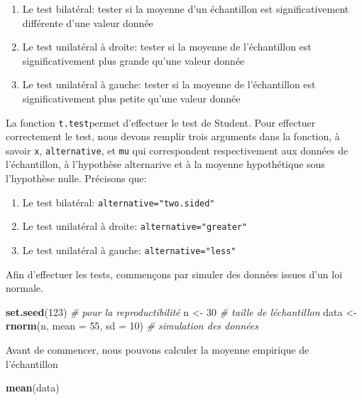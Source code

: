 \documentclass[
]{book}
\newenvironment{Shaded}{\begin{snugshade}}{\end{snugshade}}
\newcommand{\AttributeTok}[1]{\textcolor[rgb]{0.13,0.29,0.53}{#1}}
\newcommand{\CommentTok}[1]{\textcolor[rgb]{0.56,0.35,0.01}{\textit{#1}}}
\newcommand{\DecValTok}[1]{\textcolor[rgb]{0.00,0.00,0.81}{#1}}
\newcommand{\FunctionTok}[1]{\textcolor[rgb]{0.13,0.29,0.53}{\textbf{#1}}}
\newcommand{\NormalTok}[1]{#1}
\newcommand{\OtherTok}[1]{\textcolor[rgb]{0.56,0.35,0.01}{#1}}
\providecommand{\tightlist}{%
  \setlength{\itemsep}{0pt}\setlength{\parskip}{0pt}}
\begin{document}
\begin{enumerate}
\def\labelenumi{\arabic{enumi}.}
\tightlist
\item
  Le test bilatéral: tester si la moyenne d'un échantillon est significativement différente d'une valeur donnée
\item
  Le test unilatéral à droite: tester si la moyenne de l'échantillon est significativement plus grande qu'une valeur donnée
\item
  Le test unilatéral à gauche: tester si la moyenne de l'échantillon est significativement plus petite qu'une valeur donnée
\end{enumerate}

La fonction \texttt{t.test}permet d'effectuer le test de Student. Pour effectuer correctement le test, nous devons remplir trois arguments dans la fonction, à savoir \texttt{x}, \texttt{alternative}, et \texttt{mu} qui correspondent respectivement aux données de l'échantillon, à l'hypothèse alternarive et à la moyenne hypothétique sous l'hypothèse nulle. Précisons que:

\begin{enumerate}
\def\labelenumi{\arabic{enumi}.}
\tightlist
\item
  Le test bilatéral: \texttt{alternative="two.sided"}
\item
  Le test unilatéral à droite: \texttt{alternative="greater"}
\item
  Le test unilatéral à gauche: \texttt{alternative="less"}
\end{enumerate}

Afin d'effectuer les tests, commençons par simuler des données issues d'un loi normale.

\begin{Shaded}
\begin{Highlighting}[]
\FunctionTok{set.seed}\NormalTok{(}\DecValTok{123}\NormalTok{)  }\CommentTok{\# pour la reproductibilité}
\NormalTok{n }\OtherTok{\textless{}{-}} \DecValTok{30}  \CommentTok{\# taille de l\textquotesingle{}échantillon}
\NormalTok{data }\OtherTok{\textless{}{-}} \FunctionTok{rnorm}\NormalTok{(n, }\AttributeTok{mean =} \DecValTok{55}\NormalTok{, }\AttributeTok{sd =} \DecValTok{10}\NormalTok{)  }\CommentTok{\# simulation des données }
\end{Highlighting}
\end{Shaded}

Avant de commencer, nous pouvons calculer la moyenne empirique de l'échantillon

\begin{Shaded}
\begin{Highlighting}[]
\FunctionTok{mean}\NormalTok{(data)}
\end{Highlighting}
\end{Shaded}
\end{document}

